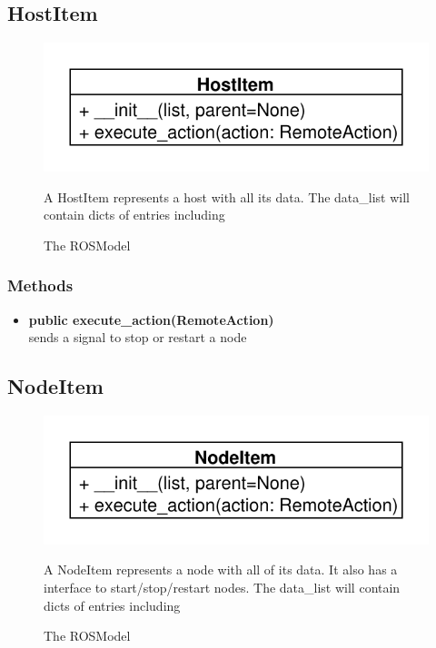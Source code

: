 \subsection{HostItem}
\begin{figure}[htbp]
	\begin{minipage}[t]{7cm}
		\vspace{0pt}
		\centering
		\includegraphics[scale=0.6]{./diagram_pictures/HostItem.pdf}
		\caption{The ROSModel}
	\end{minipage}
	\hfill
	\begin{minipage}[t]{8cm}
		\vspace{10pt}		
		A HostItem represents a host with all its data.
		The data\_list will contain dicts of entries including 
	\end{minipage}
\end{figure}
\subsubsection{Methods}
\begin{itemize}
  \item \textbf{public execute\_action(RemoteAction)}\\
  sends a signal to stop or restart a node
\end{itemize}

\subsection{NodeItem}
\begin{figure}[htbp]
	\begin{minipage}[t]{7cm}
		\vspace{0pt}
		\centering
		\includegraphics[scale=0.6]{./diagram_pictures/NodeItem.pdf}
		\caption{The ROSModel}
	\end{minipage}
	\hfill
	\begin{minipage}[t]{8cm}
		\vspace{10pt}		
		A NodeItem represents a node with all of its data. It also has a interface to
		start/stop/restart nodes. The data\_list will contain dicts of entries including 
	\end{minipage}
\end{figure} 
